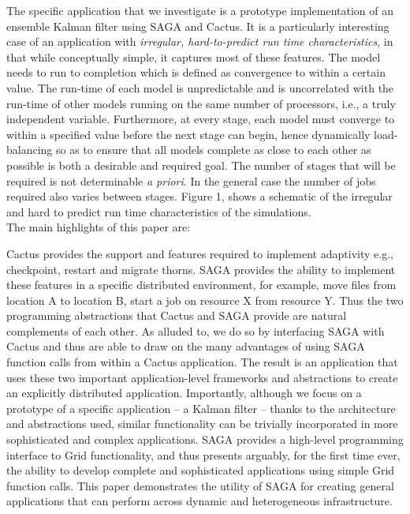 \documentclass[conference,final]{IEEEtran}
\begin{document}
The specific application that we investigate is a prototype
implementation of an ensemble Kalman filter using SAGA and Cactus. It
is a particularly interesting case of an application with {\it
  irregular, hard-to-predict run time characteristics}, in that while
conceptually simple, it captures most of these features.  The model
needs to run to completion which is defined as convergence to within a
certain value.  The run-time of each model is unpredictable and is
uncorrelated with the run-time of other models running on the same
number of processors, i.e., a truly independent variable.  Furthermore,
at every stage, each model must converge to within a specified value
before the next stage can begin, hence dynamically load-balancing so
as to ensure that all models complete as close to each other as
possible is both a desirable and required goal. The number of stages
that will be required is not determinable {\it a priori}. In the
general case the number of jobs required also varies between stages.
Figure 1, shows a schematic of the irregular and hard to predict run
time characteristics of the simulations. \\

\noindent The main highlights of this paper are:

Cactus provides the support and features required to implement
adaptivity e.g., checkpoint, restart and migrate thorns. SAGA provides
the ability to implement these features in a specific distributed
environment, for example, move files from location A to location B,
start a job on resource X from resource Y.  Thus the two programming
abstractions that Cactus and SAGA provide are natural complements of
each other.  As alluded to, we do so by interfacing SAGA with Cactus
and thus are able to draw on the many advantages of using SAGA
function calls from within a Cactus application.  The result is an
application that uses these two important application-level frameworks
and abstractions to create an explicitly distributed application.  
Importantly, although we focus on a prototype of a specific
application -- a Kalman filter -- thanks to the architecture and
abstractions used, similar functionality can be trivially incorporated
in more sophisticated and complex applications. SAGA provides a
high-level programming interface to Grid functionality, and thus
presents arguably, for the first time ever, the ability to develop
complete and sophisticated applications using simple Grid function
calls.  This paper demonstrates the utility of SAGA for creating
general applications that can perform across dynamic and heterogeneous
infrastructure.
\end{document}
